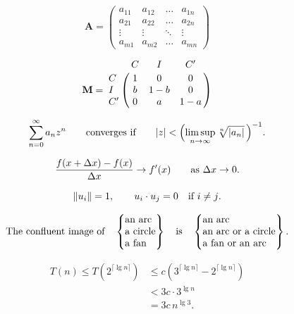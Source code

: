 \documentclass[11pt]{article}
\theoremstyle{oldplain}
\theoremstyle{plain}
\begin{document}

$$\mathbf{A} = \begin{pmatrix}a_{11}&a_{12}&\ldots&a_{1n}\\
a_{21}&a_{22}&\ldots&a_{2n}\\
\vdots&\vdots&\ddots&\vdots\\
a_{m1}&a_{m2}&\ldots&a_{mn}\end{pmatrix}$$

$$\mathbf{M}=\bordermatrix{&C&I&C'\cr
C&1&0&0\cr I&b&1-b&0\cr C'&0&a&1-a}$$


$$\sum_{n=0}^\infty a_nz^n\qquad\hbox{converges if}\qquad
|z|<\Bigl(\limsup_{n\to\infty}\root n\of{|a_n|}\,\Bigr)^{-1}.$$

$$\frac{f(x+\Delta x)-f(x)}{\Delta x}\to f'(x)
\qquad \hbox{as $\Delta x\to0$.}$$

$$\|u_i\|=1,\qquad u_i\cdot u_j=0\quad\hbox{if $i\ne j$.}$$


$$\it\hbox{The confluent image of}\quad
\begin{Bmatrix}\hbox{an arc}\hfill\\\hbox{a circle}\hfill\\
\hbox{a fan}\hfill\\\end{Bmatrix}
\quad\hbox{is}\quad
\begin{Bmatrix}\hbox{an arc}\hfill\\
\hbox{an arc or a circle}\hfill\\
\hbox{a fan or an arc}\hfill\end{Bmatrix}.$$


\begin{align*}
T(n)\le T(2^{\lceil\lg n\rceil})
&\le c(3^{\lceil\lg n\rceil}-2^{\lceil\lg n\rceil})\\
&<3c\cdot3^{\lg n}\\
&=3c\,n^{\lg3}.
\end{align*}

\end{document}
